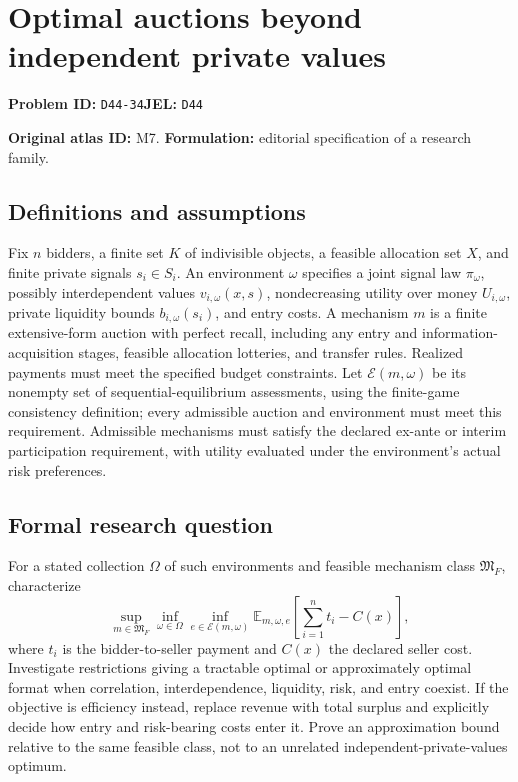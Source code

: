 \documentclass[11pt,a4paper]{article}
\begin{document}
\section*{Optimal auctions beyond independent private values}
\textbf{Problem ID:} \texttt{D44-34}\quad \textbf{JEL:} \texttt{D44}\par
\label{problem:OP-0007}
\label{atlas:prob:M7}

\noindent\textbf{Original atlas ID:} M7. \textbf{Formulation:} editorial specification of a research family.

\subsection*{Definitions and assumptions}

Fix $n$ bidders, a finite set $K$ of indivisible objects, a feasible allocation set $X$, and finite private signals $s_i\in S_i$. An environment $\omega$ specifies a joint signal law $\pi_\omega$, possibly interdependent values $v_{i,\omega}(x,s)$, nondecreasing utility over money $U_{i,\omega}$, private liquidity bounds $b_{i,\omega}(s_i)$, and entry costs. A mechanism $m$ is a finite extensive-form auction with perfect recall, including any entry and information-acquisition stages, feasible allocation lotteries, and transfer rules. Realized payments must meet the specified budget constraints. Let $\mathcal E(m,\omega)$ be its nonempty set of sequential-equilibrium assessments, using the finite-game consistency definition; every admissible auction and environment must meet this requirement. Admissible mechanisms must satisfy the declared ex-ante or interim participation requirement, with utility evaluated under the environment's actual risk preferences.

\subsection*{Formal research question}

For a stated collection $\Omega$ of such environments and feasible mechanism class $\mathfrak M_F$, characterize
\[
\sup_{m\in\mathfrak M_F}\inf_{\omega\in\Omega}\inf_{e\in\mathcal E(m,\omega)}
 \mathbb E_{m,\omega,e}\!\left[\sum_{i=1}^n t_i-C(x)\right],
\]
where $t_i$ is the bidder-to-seller payment and $C(x)$ the declared seller cost. Investigate restrictions giving a tractable optimal or approximately optimal format when correlation, interdependence, liquidity, risk, and entry coexist. If the objective is efficiency instead, replace revenue with total surplus and explicitly decide how entry and risk-bearing costs enter it. Prove an approximation bound relative to the same feasible class, not to an unrelated independent-private-values optimum.
\end{document}
